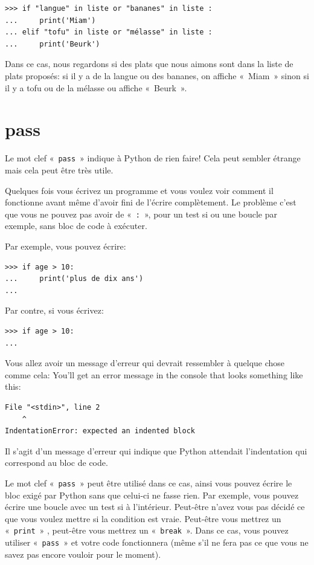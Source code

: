 \begin{Verbatim}[frame=single,rulecolor=\color{gray}]
>>> if "langue" in liste or "bananes" in liste :
...     print('Miam')
... elif "tofu" in liste or "mélasse" in liste :
...     print('Beurk')
\end{Verbatim}

Dans ce cas, nous regardons si des plats que nous aimons sont dans la liste de plats proposés: si il y a de la langue ou des bananes, on affiche «~Miam~» sinon si il y a tofu ou de la mélasse ou affiche «~Beurk~».


\section*{pass}

Le mot clef «~\texttt{pass}~» indique à Python de rien faire! Cela peut sembler étrange mais cela peut être très utile. 

Quelques fois vous écrivez un programme et vous voulez voir comment il fonctionne avant même d'avoir  fini de l'écrire complètement. Le problème c'est que vous ne pouvez pas avoir de «~\texttt{:}~», pour un test si ou une boucle par exemple, sans bloc de code à exécuter.

Par exemple, vous pouvez écrire:
\begin{Verbatim}[frame=single,rulecolor=\color{gray}]
>>> if age > 10:
...     print('plus de dix ans')
...
\end{Verbatim}

Par contre, si vous écrivez:
\begin{Verbatim}[frame=single,rulecolor=\color{gray}]
>>> if age > 10:
...
\end{Verbatim}
Vous allez avoir un message d'erreur qui devrait ressembler à quelque chose comme cela:
\noindent
You'll get an error message in the console that looks something like this:

\begin{Verbatim}[frame=single,rulecolor=\color{gray}]
  File "<stdin>", line 2
    ^
IndentationError: expected an indented block
\end{Verbatim}

Il s'agit d'un message d'erreur qui indique que Python attendait l'indentation qui correspond au bloc de code.

Le mot clef «~\texttt{pass}~» peut être utilisé dans ce cas, ainsi vous pouvez écrire le bloc exigé par Python sans que celui-ci ne fasse rien.
Par exemple, vous pouvez écrire une boucle avec un test si à l'intérieur. Peut-être n'avez vous pas décidé ce que vous voulez mettre si la condition est vraie. Peut-être vous mettrez un «~\texttt{print}~» , peut-être vous mettrez un «~\texttt{break}~». Dans ce cas, vous pouvez utiliser «~\texttt{pass}~» et votre code fonctionnera (même s'il ne fera pas ce que vous ne savez pas encore vouloir pour le moment).

